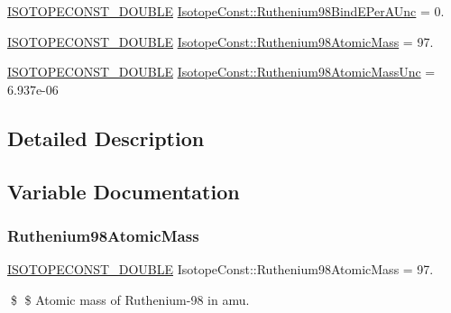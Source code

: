 \begin{DoxyCompactItemize}
\mbox{\hyperlink{group___isotope_const-_macros_ga8f45a7272ce02c0b4c65c44636ed719a}{I\+S\+O\+T\+O\+P\+E\+C\+O\+N\+S\+T\+\_\+\+D\+O\+U\+B\+LE}} \mbox{\hyperlink{group___isotope_const-_ruthenium-_ru98_ga21f68d59c19bd08210de75f348cd003b}{Isotope\+Const\+::\+Ruthenium98\+Bind\+E\+Per\+A\+Unc}} = 0.
\item 
\mbox{\hyperlink{group___isotope_const-_macros_ga8f45a7272ce02c0b4c65c44636ed719a}{I\+S\+O\+T\+O\+P\+E\+C\+O\+N\+S\+T\+\_\+\+D\+O\+U\+B\+LE}} \mbox{\hyperlink{group___isotope_const-_ruthenium-_ru98_ga4add65932ca5ee0ac272f9bb1893e93a}{Isotope\+Const\+::\+Ruthenium98\+Atomic\+Mass}} = 97.
\item 
\mbox{\hyperlink{group___isotope_const-_macros_ga8f45a7272ce02c0b4c65c44636ed719a}{I\+S\+O\+T\+O\+P\+E\+C\+O\+N\+S\+T\+\_\+\+D\+O\+U\+B\+LE}} \mbox{\hyperlink{group___isotope_const-_ruthenium-_ru98_ga3014f6c8b25ae93820effeb0a3049c3b}{Isotope\+Const\+::\+Ruthenium98\+Atomic\+Mass\+Unc}} = 6.\+937e-\/06
\end{DoxyCompactItemize}


\subsection{Detailed Description}


\subsection{Variable Documentation}
\mbox{\label{group___isotope_const-_ruthenium-_ru98_ga4add65932ca5ee0ac272f9bb1893e93a}} 
\subsubsection{\texorpdfstring{Ruthenium98\+Atomic\+Mass}{Ruthenium98AtomicMass}}
{\footnotesize\ttfamily \mbox{\hyperlink{group___isotope_const-_macros_ga8f45a7272ce02c0b4c65c44636ed719a}{I\+S\+O\+T\+O\+P\+E\+C\+O\+N\+S\+T\+\_\+\+D\+O\+U\+B\+LE}} Isotope\+Const\+::\+Ruthenium98\+Atomic\+Mass = 97.}

\$ \$ Atomic mass of Ruthenium-\/98 in amu. \mbox{\label{group___isotope_const-_ruthenium-_ru98_ga3014f6c8b25ae93820effeb0a3049c3b}} 

